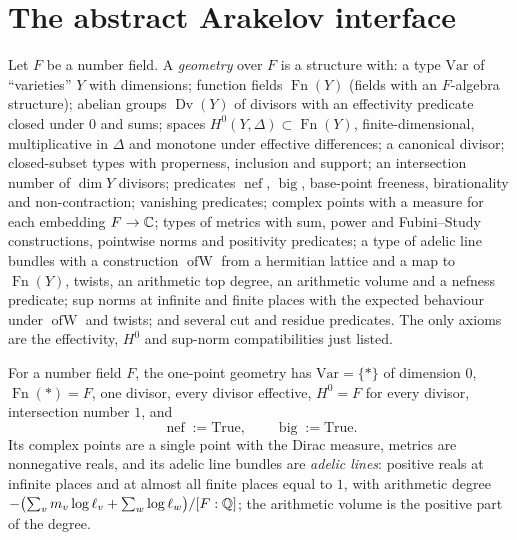 \section{The abstract Arakelov interface}

\begin{definition}\label{geoa:geo}
Let $F$ be a number field. A \emph{geometry} over $F$ is a structure with: a type
$\mathrm{Var}$ of ``varieties'' $Y$ with dimensions; function fields $\operatorname{Fn}(Y)$
(fields with an $F$-algebra structure); abelian groups $\operatorname{Dv}(Y)$ of
divisors with an effectivity predicate closed under $0$ and sums; spaces
$H^0(Y,\Delta)\subset\operatorname{Fn}(Y)$, finite-dimensional, multiplicative in $\Delta$
and monotone under effective differences; a canonical divisor; closed-subset types with
properness, inclusion and support; an intersection number of $\dim Y$ divisors; predicates
$\operatorname{nef}$, $\operatorname{big}$, base-point freeness, birationality and
non-contraction; vanishing predicates; complex points with a measure for each embedding
$F\to\mathbb{C}$; types of metrics with sum, power and Fubini--Study constructions, pointwise
norms and positivity predicates; a type of adelic line bundles with a construction
$\operatorname{ofW}$ from a hermitian lattice and a map to $\operatorname{Fn}(Y)$,
twists, an arithmetic top degree, an arithmetic volume and a nefness predicate; sup norms
at infinite and finite places with the expected behaviour under $\operatorname{ofW}$ and
twists; and several cut and residue predicates. The only axioms are the effectivity,
$H^0$ and sup-norm compatibilities just listed.
\end{definition}

\begin{definition}\label{geoa:pointgeo}
For a number field $F$, the one-point geometry has $\mathrm{Var}=\{\ast\}$ of dimension
$0$, $\operatorname{Fn}(\ast)=F$, one divisor, every divisor effective,
$H^0=F$ for every divisor, intersection number $1$, and
\[
\operatorname{nef}:=\text{True},\qquad \operatorname{big}:=\text{True}.
\]
Its complex points are a single point with the Dirac measure, metrics are nonnegative
reals, and its adelic line bundles are \emph{adelic lines}: positive reals at infinite
places and at almost all finite places equal to $1$, with arithmetic degree
$-\bigl(\sum_vm_v\log\ell_v+\sum_w\log\ell_w\bigr)/[F:\mathbb{Q}]$; the arithmetic volume is the
positive part of the degree.
\end{definition}

